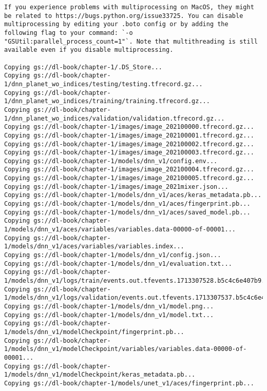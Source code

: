\documentclass[
  letterpaper,
  DIV=11,
  numbers=noendperiod]{scrreprt}
\begin{document}
\begin{verbatim}
If you experience problems with multiprocessing on MacOS, they might be related to https://bugs.python.org/issue33725. You can disable multiprocessing by editing your .boto config or by adding the following flag to your command: `-o "GSUtil:parallel_process_count=1"`. Note that multithreading is still available even if you disable multiprocessing.

Copying gs://dl-book/chapter-1/.DS_Store...
Copying gs://dl-book/chapter-1/dnn_planet_wo_indices/testing/testing.tfrecord.gz...
Copying gs://dl-book/chapter-1/dnn_planet_wo_indices/training/training.tfrecord.gz...
Copying gs://dl-book/chapter-1/dnn_planet_wo_indices/validation/validation.tfrecord.gz...
Copying gs://dl-book/chapter-1/images/image_202100000.tfrecord.gz...            
Copying gs://dl-book/chapter-1/images/image_202100001.tfrecord.gz...            
Copying gs://dl-book/chapter-1/images/image_202100002.tfrecord.gz...            
Copying gs://dl-book/chapter-1/images/image_202100003.tfrecord.gz...            
Copying gs://dl-book/chapter-1/models/dnn_v1/config.env...                      
Copying gs://dl-book/chapter-1/images/image_202100004.tfrecord.gz...            
Copying gs://dl-book/chapter-1/images/image_202100005.tfrecord.gz...            
Copying gs://dl-book/chapter-1/images/image_2021mixer.json...                   
Copying gs://dl-book/chapter-1/models/dnn_v1/aces/keras_metadata.pb...          
Copying gs://dl-book/chapter-1/models/dnn_v1/aces/fingerprint.pb...
Copying gs://dl-book/chapter-1/models/dnn_v1/aces/saved_model.pb...             
Copying gs://dl-book/chapter-1/models/dnn_v1/aces/variables/variables.data-00000-of-00001...
Copying gs://dl-book/chapter-1/models/dnn_v1/aces/variables/variables.index...
Copying gs://dl-book/chapter-1/models/dnn_v1/config.json...                     
Copying gs://dl-book/chapter-1/models/dnn_v1/evaluation.txt...                  
Copying gs://dl-book/chapter-1/models/dnn_v1/logs/train/events.out.tfevents.1713307528.b5c4c6e407b9.190.2.v2...
Copying gs://dl-book/chapter-1/models/dnn_v1/logs/validation/events.out.tfevents.1713307537.b5c4c6e407b9.190.3.v2...
Copying gs://dl-book/chapter-1/models/dnn_v1/model.png...
Copying gs://dl-book/chapter-1/models/dnn_v1/model.txt...                       
Copying gs://dl-book/chapter-1/models/dnn_v1/modelCheckpoint/fingerprint.pb...  
Copying gs://dl-book/chapter-1/models/dnn_v1/modelCheckpoint/variables/variables.data-00000-of-00001...
Copying gs://dl-book/chapter-1/models/dnn_v1/modelCheckpoint/keras_metadata.pb...
Copying gs://dl-book/chapter-1/models/unet_v1/aces/fingerprint.pb...            

\end{verbatim}
\end{document}
